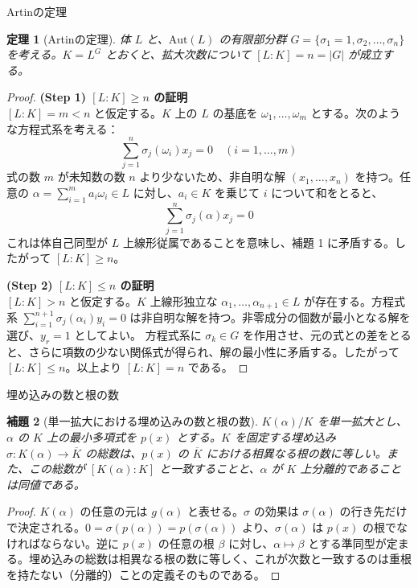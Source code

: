 \documentclass[11pt,dvipsnames]{beamer}
\newtheorem{thm}{定理}
\newtheorem{lem}[thm]{補題}
\begin{document}
\begin{frame}[allowframebreaks]{Artinの定理}
    \begin{thm}[Artinの定理]
        体 $L$ と、$\mathrm{Aut}(L)$ の有限部分群 $G = \{ \sigma_1 = 1, \sigma_2, \dots, \sigma_n \}$ を考える。$K = L^G$ とおくと、拡大次数について $[L:K] = n = |G|$ が成立する。
    \end{thm}
    
    \begin{proof}
        \textbf{(Step 1) $[L:K] \ge n$ の証明}\\
        $[L:K] = m < n$ と仮定する。$K$ 上の $L$ の基底を $\omega_1, \dots, \omega_m$ とする。次のような方程式系を考える：
        \[ \sum_{j=1}^n \sigma_j(\omega_i) x_j = 0 \quad (i = 1, \dots, m) \]
        式の数 $m$ が未知数の数 $n$ より少ないため、非自明な解 $(x_1, \dots, x_n)$ を持つ。任意の $\alpha = \sum_{i=1}^m a_i \omega_i \in L$ に対し、$a_i \in K$ を乗じて $i$ について和をとると、
        \[ \sum_{j=1}^n \sigma_j(\alpha) x_j = 0 \]
        これは体自己同型が $L$ 上線形従属であることを意味し、補題 1 に矛盾する。したがって $[L:K] \ge n$。

        \textbf{(Step 2) $[L:K] \le n$ の証明}\\
        $[L:K] > n$ と仮定する。$K$ 上線形独立な $\alpha_1, \dots, \alpha_{n+1} \in L$ が存在する。方程式系 $\sum_{i=1}^{n+1} \sigma_j(\alpha_i) y_i = 0$ は非自明な解を持つ。非零成分の個数が最小となる解を選び、$y_r = 1$ としてよい。
        方程式系に $\sigma_k \in G$ を作用させ、元の式との差をとると、さらに項数の少ない関係式が得られ、解の最小性に矛盾する。したがって $[L:K] \le n$。以上より $[L:K] = n$ である。
    \end{proof}
\end{frame}

\begin{frame}[allowframebreaks]{埋め込みの数と根の数}
    \begin{lem}[単一拡大における埋め込みの数と根の数]
        $K(\alpha)/K$ を単一拡大とし、$\alpha$ の $K$ 上の最小多項式を $p(x)$ とする。$K$ を固定する埋め込み $\sigma: K(\alpha) \to \overline{K}$ の総数は、$p(x)$ の $\overline{K}$ における相異なる根の数に等しい。また、この総数が $[K(\alpha):K]$ と一致することと、$\alpha$ が $K$ 上分離的であることは同値である。
    \end{lem}
    
    \begin{proof}
        $K(\alpha)$ の任意の元は $g(\alpha)$ と表せる。$\sigma$ の効果は $\sigma(\alpha)$ の行き先だけで決定される。$0 = \sigma(p(\alpha)) = p(\sigma(\alpha))$ より、$\sigma(\alpha)$ は $p(x)$ の根でなければならない。逆に $p(x)$ の任意の根 $\beta$ に対し、$\alpha \mapsto \beta$ とする準同型が定まる。埋め込みの総数は相異なる根の数に等しく、これが次数と一致するのは重根を持たない（分離的）ことの定義そのものである。
    \end{proof}
\end{frame}
\end{document}
